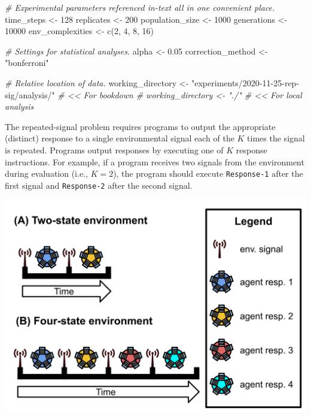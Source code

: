 \documentclass[
]{book}
\newenvironment{Shaded}{\begin{snugshade}}{\end{snugshade}}
\newcommand{\CommentTok}[1]{\textcolor[rgb]{0.56,0.35,0.01}{\textit{#1}}}
\newcommand{\DecValTok}[1]{\textcolor[rgb]{0.00,0.00,0.81}{#1}}
\newcommand{\FloatTok}[1]{\textcolor[rgb]{0.00,0.00,0.81}{#1}}
\newcommand{\FunctionTok}[1]{\textcolor[rgb]{0.00,0.00,0.00}{#1}}
\newcommand{\NormalTok}[1]{#1}
\newcommand{\OtherTok}[1]{\textcolor[rgb]{0.56,0.35,0.01}{#1}}
\newcommand{\StringTok}[1]{\textcolor[rgb]{0.31,0.60,0.02}{#1}}
\begin{document}
\begin{Shaded}
\begin{Highlighting}[]
\CommentTok{\# Experimental parameters referenced in{-}text all in one convenient place.}
\NormalTok{time\_steps }\OtherTok{\textless{}{-}} \DecValTok{128}
\NormalTok{replicates }\OtherTok{\textless{}{-}} \DecValTok{200}
\NormalTok{population\_size }\OtherTok{\textless{}{-}} \DecValTok{1000}
\NormalTok{generations }\OtherTok{\textless{}{-}} \DecValTok{10000}
\NormalTok{env\_complexities }\OtherTok{\textless{}{-}} \FunctionTok{c}\NormalTok{(}\DecValTok{2}\NormalTok{, }\DecValTok{4}\NormalTok{, }\DecValTok{8}\NormalTok{, }\DecValTok{16}\NormalTok{)}

\CommentTok{\# Settings for statistical analyses.}
\NormalTok{alpha }\OtherTok{\textless{}{-}} \FloatTok{0.05}
\NormalTok{correction\_method }\OtherTok{\textless{}{-}} \StringTok{"bonferroni"}

\CommentTok{\# Relative location of data.}
\NormalTok{working\_directory }\OtherTok{\textless{}{-}} \StringTok{"experiments/2020{-}11{-}25{-}rep{-}sig/analysis/"} \CommentTok{\# \textless{}\textless{} For bookdown}
\CommentTok{\# working\_directory \textless{}{-} "./"                                     \# \textless{}\textless{} For local analysis}
\end{Highlighting}
\end{Shaded}

The repeated-signal problem requires programs to output the appropriate (distinct) response to a single environmental signal each of the \(K\) times the signal is repeated.
Programs output responses by executing one of \(K\) response instructions.
For example, if a program receives two signals from the environment during evaluation (i.e., \(K=2\)), the program should execute \texttt{Response-1} after the first signal and \texttt{Response-2} after the second signal.

\includegraphics{experiments/2020-11-25-rep-sig/analysis/../../../media/repeated-signal-task.png}
\end{document}
